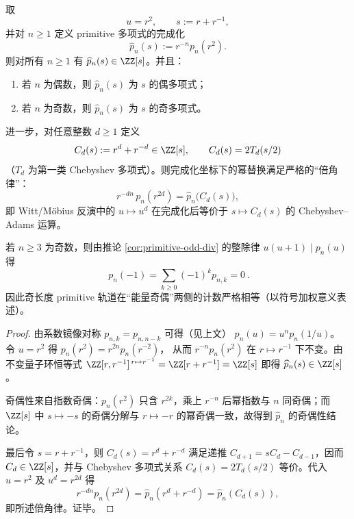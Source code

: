 \begin{corollary}\label{cor:primitive-completion-hatp}
取
\[
u=r^2,\qquad s:=r+r^{-1},
\]
并对 \(n\ge 1\) 定义 primitive 多项式的完成化
\[
\widehat p_n(s):=r^{-n}p_n(r^2).
\]
则对所有 \(n\ge 1\) 有 \(\widehat p_n(s)\in\ZZ[s]\)。并且：
\begin{enumerate}
  \item 若 \(n\) 为偶数，则 \(\widehat p_n(s)\) 为 \(s\) 的偶多项式；
  \item 若 \(n\) 为奇数，则 \(\widehat p_n(s)\) 为 \(s\) 的奇多项式。
\end{enumerate}
进一步，对任意整数 \(d\ge 1\) 定义
\[
C_d(s):=r^d+r^{-d}\in\ZZ[s],
\qquad
C_d(s)=2T_d(s/2)
\]
（\(T_d\) 为第一类 Chebyshev 多项式）。则完成化坐标下的幂替换满足严格的“倍角律”：
\[
r^{-dn}\,p_n(r^{2d})=\widehat p_n\!\bigl(C_d(s)\bigr),
\]
即 Witt/Möbius 反演中的 \(u\mapsto u^d\) 在完成化后等价于 \(s\mapsto C_d(s)\) 的 Chebyshev--Adams 运算。
\end{corollary}

\begin{corollary}[奇长度的严格奇偶平衡：\texorpdfstring{$p_n(-1)=0$}{p_n(-1)=0}]\label{cor:primitive-odd-parity-balance}
若 \(n\ge 3\) 为奇数，则由推论 \ref{cor:primitive-odd-div} 的整除律 \(u(u+1)\mid p_n(u)\) 得
\[
\boxed{\ p_n(-1)=\sum_{k\ge 0}(-1)^k p_{n,k}=0\ }.
\]
因此奇长度 primitive 轨道在“能量奇偶”两侧的计数严格相等（以符号加权意义表述）。
\end{corollary}
\begin{proof}
由系数镜像对称 \(p_{n,k}=p_{n,n-k}\) 可得（见上文）
\(
p_n(u)=u^n p_n(1/u)
\)。
令 \(u=r^2\) 得
\(
p_n(r^2)=r^{2n}p_n(r^{-2})
\)，
从而 \(r^{-n}p_n(r^2)\) 在 \(r\mapsto r^{-1}\) 下不变。由不变量子环恒等式
\(
\ZZ[r,r^{-1}]^{\,r\mapsto r^{-1}}=\ZZ[r+r^{-1}]=\ZZ[s]
\)
即得 \(\widehat p_n(s)\in\ZZ[s]\)。
\par
奇偶性来自指数奇偶：\(p_n(r^2)\) 只含 \(r^{2k}\)，乘上 \(r^{-n}\) 后幂指数与 \(n\) 同奇偶；而 \(\ZZ[s]\) 中 \(s\mapsto -s\) 的奇偶分解与 \(r\mapsto -r\) 的幂奇偶一致，故得到 \(\widehat p_n\) 的奇偶性结论。
\par
最后令 \(s=r+r^{-1}\)，则
\(
C_d(s)=r^d+r^{-d}
\)
满足递推 \(C_{d+1}=sC_d-C_{d-1}\)，因而 \(C_d\in\ZZ[s]\)，并与 Chebyshev 多项式关系 \(C_d(s)=2T_d(s/2)\) 等价。代入 \(u=r^2\) 及 \(u^d=r^{2d}\) 得
\[
r^{-dn}p_n(r^{2d})=\widehat p_n(r^d+r^{-d})=\widehat p_n(C_d(s)),
\]
即所述倍角律。证毕。
\end{proof}


